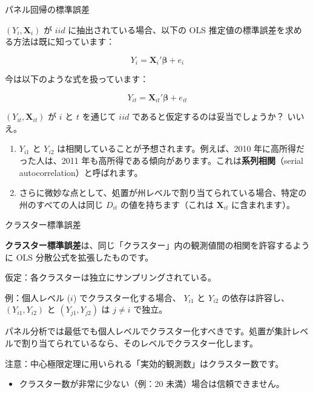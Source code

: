 \documentclass[11pt,handout]{beamer}
\newenvironment{wideitemize}{\itemize\addtolength{\itemsep}{10pt}}{\enditemize}
\newenvironment{wideitemizeshort}{\itemize}{\enditemize}
\begin{document}
\begin{frame}{パネル回帰の標準誤差}
\begin{wideitemize}
	\item
	$(Y_i,\bm{X}_i)$ が $iid$ に抽出されている場合、以下の OLS 推定値の標準誤差を求める方法は既に知っています：
	
	$$Y_i = \bm{X}_i'\bm{\beta} + e_i$$
	
	\pause
	\item
	今は以下のような式を扱っています：
	
		$$Y_{it} = \bm{X}_{it}'\bm{\beta} + e_{it}$$
		
	\pause
	\item
	$(Y_{it}, \bm{X}_{it})$ が $i$ と $t$ を通じて $iid$ であると仮定するのは妥当でしょうか？ \pause{} いいえ。
	
	\pause
	\begin{enumerate}
		\item 
		$Y_{i1}$ と $Y_{i2}$ は相関していることが予想されます。例えば、2010 年に高所得だった人は、2011 年も高所得である傾向があります。これは\textbf{系列相関}（serial autocorrelation）と呼ばれます。
		
		\pause
		\item
		さらに微妙な点として、処置が州レベルで割り当てられている場合、特定の州のすべての人は同じ $D_{it}$ の値を持ちます（これは $\bm{X}_{it}$ に含まれます）。
	\end{enumerate}


\end{wideitemize}
\end{frame}

\begin{frame}{クラスター標準誤差}
	{\small \color{black}
	\begin{wideitemizeshort}
		\item 
		\textbf{クラスター標準誤差}は、同じ「クラスター」内の観測値間の相関を許容するように OLS 分散公式を拡張したものです。
		
		\pause
		\item
		仮定：各クラスターは独立にサンプリングされている。
		
		\pause
		\item
		例：個人レベル ($i$) でクラスター化する場合、 $Y_{i1}$ と $Y_{i2}$ の依存は許容し、 $(Y_{i1},Y_{i2})$ と $(Y_{j1},Y_{j2})$ は $j\neq i$ で独立。
		
		\pause
		\item
		パネル分析では最低でも個人レベルでクラスター化すべきです。処置が集計レベルで割り当てられているなら、そのレベルでクラスター化します。
		
		\pause
		\item
		注意：中心極限定理に用いられる「実効的観測数」はクラスター数です。
			\begin{itemize}
				\item 
				クラスター数が非常に少ない（例：20 未満）場合は信頼できません。
			\end{itemize}	
	\end{wideitemizeshort}
	}
\end{frame}
\end{document}
